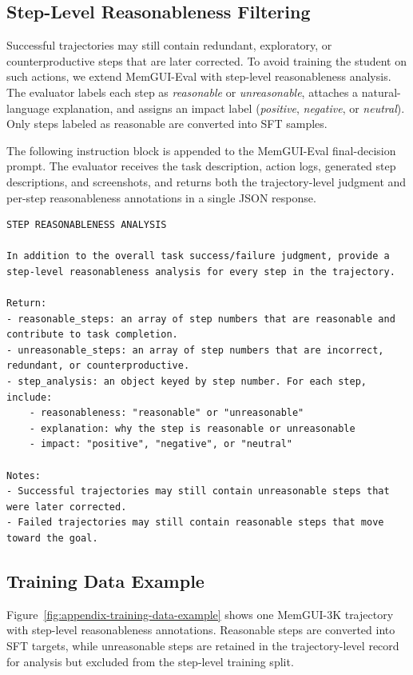 \documentclass{llmxive}
\begin{document}
\subsection{Step-Level Reasonableness Filtering}
\label{sec:appendix-step-filtering}

Successful trajectories may still contain redundant, exploratory, or counterproductive steps that are later corrected. To avoid training the student on such actions, we extend MemGUI-Eval with step-level reasonableness analysis. The evaluator labels each step as \emph{reasonable} or \emph{unreasonable}, attaches a natural-language explanation, and assigns an impact label (\emph{positive}, \emph{negative}, or \emph{neutral}). Only steps labeled as reasonable are converted into SFT samples.

The following instruction block is appended to the MemGUI-Eval final-decision prompt. The evaluator receives the task description, action logs, generated step descriptions, and screenshots, and returns both the trajectory-level judgment and per-step reasonableness annotations in a single JSON response.

\begin{Verbatim}[fontsize=\footnotesize,breaklines=true,breakanywhere=true]
STEP REASONABLENESS ANALYSIS

In addition to the overall task success/failure judgment, provide a step-level reasonableness analysis for every step in the trajectory.

Return:
- reasonable_steps: an array of step numbers that are reasonable and contribute to task completion.
- unreasonable_steps: an array of step numbers that are incorrect, redundant, or counterproductive.
- step_analysis: an object keyed by step number. For each step, include:
    - reasonableness: "reasonable" or "unreasonable"
    - explanation: why the step is reasonable or unreasonable
    - impact: "positive", "negative", or "neutral"

Notes:
- Successful trajectories may still contain unreasonable steps that were later corrected.
- Failed trajectories may still contain reasonable steps that move toward the goal.
\end{Verbatim}

\subsection{Training Data Example}
\label{sec:appendix-training-data-example}

Figure~\ref{fig:appendix-training-data-example} shows one MemGUI-3K trajectory with step-level reasonableness annotations. Reasonable steps are converted into SFT targets, while unreasonable steps are retained in the trajectory-level record for analysis but excluded from the step-level training split.
\end{document}
